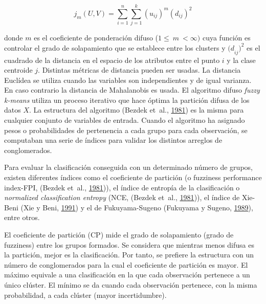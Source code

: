 \documentclass[11pt,b5paper,]{krantz}
\begin{document}
\[j_m(U,V)=\sum_{i=1}^{n}\sum_{j=1}^{k}(u_{ij})^m(d_{ij})^2\]

donde \(m\) es el coeficiente de ponderación difuso
(\(1\le\ m\ < \infty)\) cuya función es controlar el grado de
solapamiento que se establece entre los clusters y \({{(d}_{ij})}^2\) es
el cuadrado de la distancia en el espacio de los atributos entre el
punto \(i\) y la clase centroide \(j\). Distintas métricas de distancia
pueden ser usadas. La distancia Euclídea se utiliza cuando las variables
son independientes y de igual varianza. En caso contrario la distancia
de Mahalanobis es usada. El algoritmo difuso \emph{fuzzy k-means}
utiliza un proceso iterativo que hace óptima la partición difusa de los
datos \(X\). La estructura del algoritmo (Bezdek et~al.,
\protect\hyperlink{ref-Bezdek_Coray_Gunderson_Watson_1981}{1981}) es la
misma para cualquier conjunto de variables de entrada. Cuando el
algoritmo ha asignado pesos o probabilidades de pertenencia a cada grupo
para cada observación, se computaban una serie de índices para validar
los distintos arreglos de conglomerados.

Para evaluar la clasificación conseguida con un determinado número de
grupos, existen diferentes índices como el coeficiente de partición (o
fuzziness performance index-FPI, (Bezdek et~al.,
\protect\hyperlink{ref-Bezdek_Coray_Gunderson_Watson_1981}{1981})), el
índice de entropía de la clasificación o \emph{normalized classification
entropy} (NCE, (Bezdek et~al.,
\protect\hyperlink{ref-Bezdek_Coray_Gunderson_Watson_1981}{1981})), el
índice de Xie-Beni (Xie y Beni,
\protect\hyperlink{ref-Xie_Beni_1991}{1991}) y el de Fukuyama-Sugeno
(Fukuyama y Sugeno, \protect\hyperlink{ref-Fukuyama_Sugeno_1989}{1989}),
entre otros.

El coeficiente de partición (CP) mide el grado de solapamiento (grado de
fuzziness) entre los grupos formados. Se considera que mientras menos
difusa es la partición, mejor es la clasificación. Por tanto, se
prefiere la estructura con un número de conglomerados para la cual el
coeficiente de partición es mayor. El máximo equivale a una
clasificación en la que cada observación pertenece a un único clúster.
El mínimo se da cuando cada observación pertenece, con la misma
probabilidad, a cada clúster (mayor incertidumbre).
\end{document}
